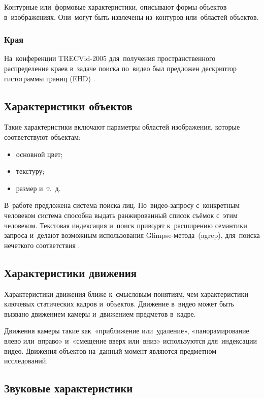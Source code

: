 Контурные или~формовые характеристики, описывают формы объектов в~изображениях.
Они~могут быть извлечены из~контуров или~областей объектов.


\subsubsection{Края}

На~конференции TRECVid-2005 для~получения
пространственного распределение краев в~задаче поиска по~видео был предложен
дескриптор гистограммы границ (EHD) \cite{Hauptmann:2003}.

\subsection{Характеристики объектов}

Такие характеристики включают параметры областей изображения,
которые соответствуют объектам:
\begin{itemize}
    \item основной цвет;
    \item текстуру;
    \item размер и~т.~д.
\end{itemize}

В~работе \cite{Sivic:2005} предложена система поиска лиц.
По~видео-запросу с~конкретным человеком
система способна выдать ранжированный список съёмок с~этим человеком.
Текстовая индексация и~поиск приводят к~расширению семантики запроса
и~делают возможным использования Glimpse-метода\ (agrep),
для~поиска нечеткого соответствия \cite{Li:2002}.


\subsection{Характеристики движения}

Характеристики движения ближе к~смысловым понятиям,
чем характеристики ключевых статических кадров и~объектов.
Движение в~видео может быть вызвано движением камеры
и~движением предметов в~кадре.

Движения камеры такие как~«приближение или~удаление»,
«панорамирование влево или~вправо» и~«смещение вверх или~вниз»
используются для~индексации видео.
Движения объектов на~данный момент являются предметном исследований.

\subsection{Звуковые характеристики}


